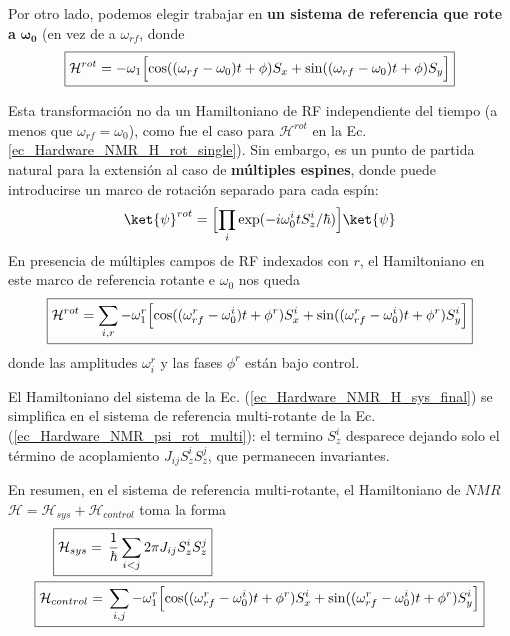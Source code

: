 \documentclass[a4paper,11pt]{book} %
\numberwithin{equation}{chapter}
\def\Lc{\Bigl[}
\def\Rc{\Bigr]}
\begin{document}
Por otro lado, podemos elegir trabajar en \textbf{un sistema de referencia que rote a} $\bm{\omega_0}$ (en vez de a $\omega_{rf}$, donde
	\begin{equation}
	\boxed{\mathcal{H}^{rot} = - \omega_1 \Lc \cos ((\omega_{rf} - \omega_0)t + \phi) S_x + \sin ((\omega_{rf} - \omega_0)t + \phi) S_y \Rc}
	\end{equation}

Esta transformación no da un Hamiltoniano de RF independiente del tiempo (a menos que $\omega_{rf} = \omega_0$), como fue el caso para $\mathcal{H}^{rot}$ en la Ec. \ref{ec_Hardware_NMR_H_rot_single}). Sin embargo, es un punto de partida natural para la extensión al caso de \textbf{múltiples espines}, donde puede introducirse un marco de rotación separado para cada espín:
	\begin{equation} \label{ec_Hardware_NMR_psi_rot_multi}
	\ket{\psi}^{rot} = \Lc \prod_i \exp (-i \omega_0^i t S^i_z/\hbar ) \Rc \ket{\psi}
	\end{equation}
En presencia de múltiples campos de RF indexados con $r$, el Hamiltoniano en este marco de referencia rotante e $\omega_0$ nos queda
	\begin{equation}
	\boxed{\mathcal{H}^{rot} = \sum_{i,r} - \omega_1^r \Lc \cos ((\omega_{rf}^r - \omega_0^i)t + \phi^r) S_x^i + \sin ((\omega_{rf}^r - \omega_0^i) t +\phi^r) S_y^i  \Rc}
	\end{equation}
donde las amplitudes $\omega_i^r$ y las fases $\phi^r$ están bajo control. 

El Hamiltoniano del sistema de la Ec. (\ref{ec_Hardware_NMR_H_sys_final}) se simplifica en el sistema de referencia multi-rotante de la Ec. (\ref{ec_Hardware_NMR_psi_rot_multi}): el termino $S_z^i$ desparece dejando solo el término de acoplamiento $J_{ij} S_z^i S_z^j$, que permanecen invariantes.

En resumen, en el sistema de referencia multi-rotante, el Hamiltoniano de $NMR$ $\mathcal{H} = \mathcal{H}_{sys} + \mathcal{H}_{control}$ toma la forma
	\begin{equation} \label{ec_Hardware_NMR_H_sys_control_final_multi_rot} 
	\begin{aligned}
	& ~~~~ \boxed{ \mathcal{H}_{sys} =  \, \frac{1}{\hbar} \sum_{i<j} 2 \pi J_{ij} S_z^i S_z^j} \\
	&\boxed{\mathcal{H}_{control} =  \, \sum_{i,j} - \omega_1^r \Lc \cos ((\omega_{rf}^r - \omega_0^i)t +\phi^r) S_x^i + \sin ((\omega_{rf}^r-\omega_0^i)t +\phi^r) S^i_y \Rc} 
	\end{aligned}
	\end{equation}
\end{document}
